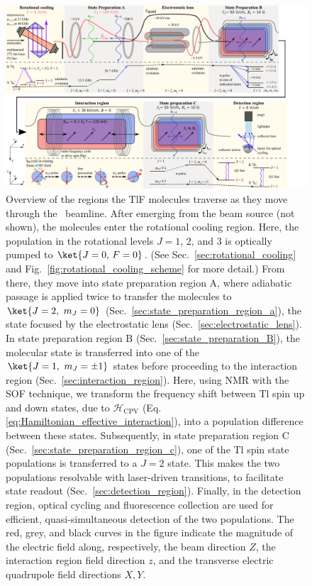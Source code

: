 \begin{figure}
	\centering
	\def\svgwidth{\textwidth}
	\includegraphics[width=\textwidth]{figs/svg/whole_experiment_A4.pdf}
	\caption{Overview of the regions the TlF molecules traverse as they move through the \CENTREX\ beamline. After emerging from the beam source (not shown), the molecules enter the rotational cooling region. Here, the population in the rotational levels $J = 1$, 2, and 3 is optically pumped to $\ket{J=0,\,F=0}$. (See Sec.~\ref{sec:rotational_cooling} and Fig.~\ref{fig:rotational_cooling_scheme} for more detail.) From there, they move into state preparation region A, where adiabatic passage is applied twice to transfer the molecules to $\ket{J=2,\ m_J=0}$ (Sec.~\ref{sec:state_preparation_region_a}), the state focused by the electrostatic lens (Sec.~\ref{sec:electrostatic_lens}). In state preparation region B (Sec.~\ref{sec:state_preparation_B}), the molecular state is transferred into one of the $\ket{J=1,\ m_J=\pm1}$ states before proceeding to the interaction region (Sec.~\ref{sec:interaction_region}). Here, using NMR with the SOF technique, we transform the frequency shift between Tl spin up and down states, due to $\mathcal{H}_\text{CPV}$ (Eq. \ref{eq:Hamiltonian_effective_interaction}), into a population difference between these states. Subsequently, in state preparation region C (Sec.~\ref{sec:state_preparation_region_c}), one of the Tl spin state populations is transferred to a $J=2$ state. This makes the two populations resolvable with laser-driven transitions, to facilitate state readout (Sec.~\ref{sec:detection_region}). Finally, in the detection region, optical cycling and fluorescence collection are used for efficient, quasi-simultaneous detection of the two populations.  The red, grey, and black curves in the figure indicate the magnitude of the electric field along, respectively, the beam direction $Z$, the interaction region field direction $z$, and the transverse electric quadrupole field directions $X,Y$.}
	\label{fig:beamline_schematic}
\end{figure}

